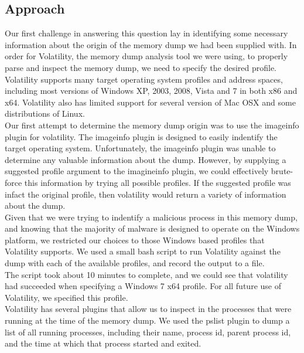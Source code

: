 \subsection{Approach}
Our first challenge in answering this question lay in identifying some necessary information about the origin of the memory dump we had been supplied with. In order for Volatility, the memory dump analysis tool we were using, to properly parse and inspect the memory dump, we need to specify the desired profile. Volatility supports many target operating system profiles and address spaces, including most versions of Windows XP, 2003, 2008, Vista and 7 in both x86 and x64. Volatility also has limited support for several version of Mac OSX and some distributions of Linux. \\
Our first attempt to determine the memory dump origin was to use the imageinfo plugin for volatility. The imageinfo plugin is designed to easily indentify the target operating system. Unfortunately, the imageinfo plugin was unable to determine any valuable information about the dump. However, by supplying a suggested profile argument to the imagineinfo plugin, we could effectively brute-force this information by trying all possible profiles. If the suggested profile was infact the original profile, then volatility would return a variety of information about the dump. \\
Given that we were trying to indentify a malicious process in this memory dump, and knowing that the majority of malware is designed to operate on the Windows platform, we restricted our choices to those Windows based profiles that Volatility supports. We used a small bash script to run Volatility against the dump with each of the available profiles, and record the output to a file.\\ 
The script took about 10 minutes to complete, and we could see that volatility had succeeded when specifying a Windows 7 x64 profile. For all future use of Volatility, we specified this profile.\\
Volatility has several plugins that allow us to inspect in the processes that were running at the time of the memory dump. We used the pslist plugin to dump a list of all running processes, including their name, process id, parent process id, and the time at which that process started and exited. \\
